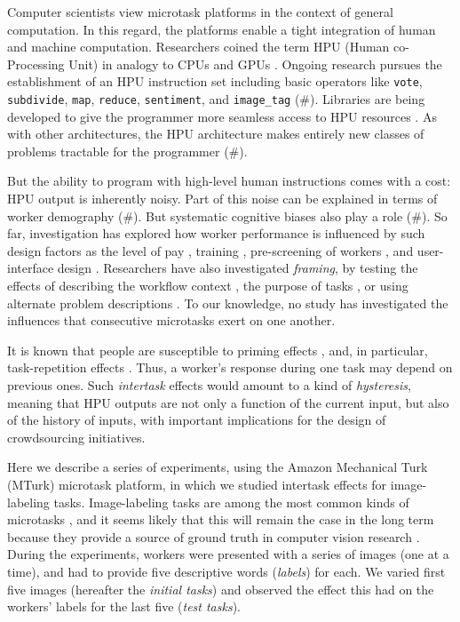 \documentclass[12pt]{article}
\begin{document}
Computer scientists view microtask platforms in the context of general
computation.  In this regard, the platforms enable a tight integration of 
human and machine computation.  Researchers coined the term HPU 
(Human co-Processing Unit) in analogy to CPUs and GPUs \cite{5543192}.  
Ongoing research pursues the establishment of an HPU instruction set
including basic operators like \texttt{vote}, \texttt{subdivide}, \texttt{map},
\texttt{reduce}, \texttt{sentiment}, and \texttt{image\_tag} (\#).  Libraries 
are being developed to give the programmer more seamless access to HPU 
resources 
 \cite{little2010turkit,minder2011crowdlang,minder2012crowdlang,kittur2011crowdforge}.  
As with other architectures, the HPU architecture makes entirely new classes 
of problems tractable for the programmer (\#).

But the ability to program with high-level human instructions comes with a 
cost: HPU output is inherently noisy.  Part of this noise can be explained
in terms of worker demography (\#).  But systematic cognitive biases also 
play a role (\#).   
So far, investigation has explored how worker performance is influenced by
such design factors as the level of 
pay \cite{kazai2013analysis}, training \cite{le2010ensuring}, pre-screening of 
workers \cite{paolacci2010running}, and user-interface design 
\cite{Finnerty2013}.  Researchers have also investigated \textit{framing}, 
by testing the effects of describing the workflow context 
\cite{Kinnaird2012281}, the purpose of tasks 
\cite{chandler2013breaking}, or using alternate problem descriptions
\cite{thibodeau2013natural}.  To our knowledge, no study has investigated 
the influences that consecutive microtasks exert on one another.

It is known that people are susceptible to priming effects 
\cite{BJOP1796,No2007,beller1971priming}, and, in particular, task-repetition 
effects \cite{Gass1999549,sohn2001task}.  Thus, a worker's response during
one task may depend on previous ones.  Such \textit{intertask} effects
would amount to a kind of \textit{hysteresis}, meaning that HPU outputs are not
only a function of the current input, but also of the history of inputs, with
important implications for the design of crowdsourcing initiatives.

Here we describe a series of experiments, using the Amazon Mechanical
Turk (MTurk) microtask platform, in which we studied intertask effects
for image-labeling tasks.  Image-labeling tasks are among the most 
common kinds of microtasks
\cite{chandler2013breaking,Berinsky2012351,Finnerty2013,paolacci2010running}, 
and it seems likely that this will remain the case in the long term because
they provide a source of ground truth in computer vision research 
\cite{5543192}.  
During the experiments, workers were presented with a series of images (one at
a time), and had to provide five descriptive words (\textit{labels}) for each.
We varied first five images (hereafter the \textit{initial tasks})
and observed the effect this had on the workers' labels for the last five
(\textit{test tasks}).
\end{document}
